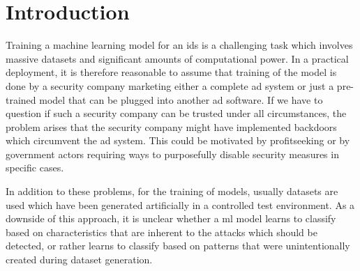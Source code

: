 \documentclass[10pt,sigconf,letterpaper,dvipsnames]{acmart}
\begin{document}

\maketitle

\section{Introduction}

Training a machine learning model for an \gls{ids} is a challenging task which involves massive datasets and significant amounts of computational power. In a practical deployment, it is therefore reasonable to assume that training of the model is done by a security company marketing either a complete \gls{ad} system or just a pre-trained model that can be plugged into another \gls{ad} software. %
If we have to question if such a security company can be trusted under all circumstances, the problem arises that the security company might have implemented backdoors which circumvent the \gls{ad} system. This could be motivated by profitseeking or by government actors requiring ways to purposefully disable security measures in specific cases.

In addition to these problems, for the training of models, usually datasets are used which have been generated artificially in a controlled test environment. As a downside of this approach, it is unclear whether a \gls{ml} model learns to classify based on characteristics that are inherent to the attacks which should be detected, or rather learns to classify based on patterns that were unintentionally created during dataset generation.
\end{document}
